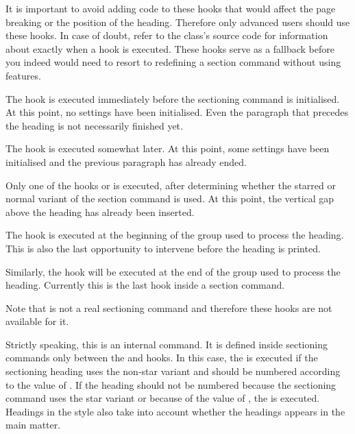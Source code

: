 It is important to avoid adding code to these hooks that
would affect the page breaking or the position of the heading. Therefore only
advanced users should use these hooks. In case of doubt, refer to the class's
source code for information about exactly when a hook is executed. These hooks
serve as a fallback before you indeed would need to resort to redefining
a section command without using \KOMAScript{} features.

The hook
 is executed immediately before the
sectioning command is initialised. At this point, no settings have been
initialised. Even the paragraph that precedes the heading is not
necessarily finished yet.

The hook
 is executed somewhat later. At this
point, some settings have been initialised and the previous paragraph has
already ended.

Only one of the hooks
 or
 is executed, after determining
whether the starred or normal variant of the section command is used. At this
point, the vertical gap above the heading has already been inserted.

The hook
 is executed at the beginning of
the group used to process the heading. This is also the last opportunity to
intervene before the heading is printed.

Similarly, the hook
 will be executed at the end of the
group used to process the heading. Currently this is the last hook inside
a section command.

Note that
 is not a real sectioning command and therefore
these hooks are not available for it.%
\EndIndexGroup

\begin{Declaration}
\end{Declaration}
Strictly speaking, this is an internal command. It is defined
inside sectioning commands only between the 
and  hooks. In this case, the
 is executed if the sectioning heading uses the non-star
variant and should be numbered according to the value of
. If the heading should not be numbered
because the sectioning command uses the star variant or because of the value
of , the  is executed.
Headings in the  style also take into account whether
the headings appears in the main matter.

